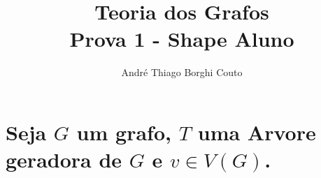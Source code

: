 \documentclass[final,3p,12pt]{elsarticle}
\begin{document}
	\begin{frontmatter}

		\title{Teoria dos Grafos \\
		\large Prova 1 - Shape Aluno}

		\author{André Thiago Borghi Couto}
		\address{São Mateus - ES, Brasil}
	\end{frontmatter}






\section{Seja $G$ um grafo, $T$ uma Arvore geradora de $G$ e $v \in V(G)$.}
	\label{S:1}
\end{document}
